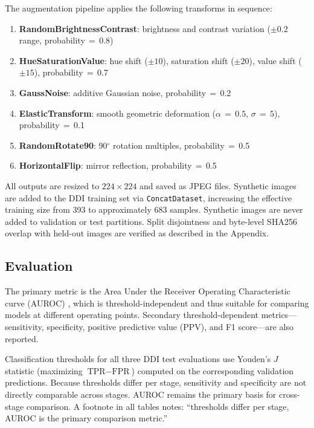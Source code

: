 The augmentation pipeline applies the following transforms in sequence:
\begin{enumerate}
    \item \textbf{RandomBrightnessContrast}: brightness and contrast variation ($\pm 0.2$ range, probability\,$=$\,0.8)
    \item \textbf{HueSaturationValue}: hue shift ($\pm 10$), saturation shift ($\pm 20$), value shift ($\pm 15$), probability\,$=$\,0.7
    \item \textbf{GaussNoise}: additive Gaussian noise, probability\,$=$\,0.2
    \item \textbf{ElasticTransform}: smooth geometric deformation ($\alpha\,{=}\,0.5$, $\sigma\,{=}\,5$), probability\,$=$\,0.1
    \item \textbf{RandomRotate90}: 90$^\circ$ rotation multiples, probability\,$=$\,0.5
    \item \textbf{HorizontalFlip}: mirror reflection, probability\,$=$\,0.5
\end{enumerate}

All outputs are resized to $224 \times 224$ and saved as JPEG files. Synthetic images are added to the DDI training set via \texttt{ConcatDataset}, increasing the effective training size from 393 to approximately 683 samples. Synthetic images are never added to validation or test partitions. Split disjointness and byte-level SHA256 overlap with held-out images are verified as described in the Appendix.

\subsection{Evaluation}

The primary metric is the Area Under the Receiver Operating Characteristic curve (AUROC) \cite{Hanley1982}, which is threshold-independent and thus suitable for comparing models at different operating points. Secondary threshold-dependent metrics---sensitivity, specificity, positive predictive value (PPV), and F1 score---are also reported.

Classification thresholds for all three DDI test evaluations use Youden's $J$ statistic (maximizing $\text{TPR} - \text{FPR}$) computed on the corresponding validation predictions. Because thresholds differ per stage, sensitivity and specificity are not directly comparable across stages. AUROC remains the primary basis for cross-stage comparison. A footnote in all tables notes: ``thresholds differ per stage, AUROC is the primary comparison metric.''

